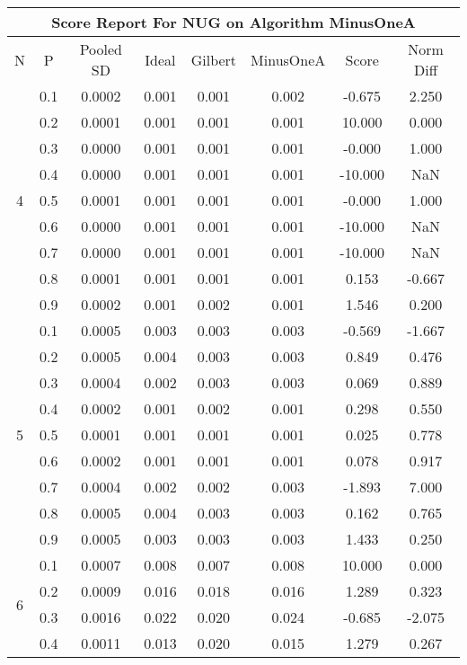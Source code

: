 \documentclass[11pt,a4paper]{report}
\begin{document}
\begin{longtable}{ | c | c || c | c | c | c | c | c | }
\hline
\multicolumn{8}{|c|}{ Score Report For NUG on Algorithm MinusOneA} \\
\hline
N & P & Pooled SD &  Ideal &  Gilbert & MinusOneA  & Score & Norm Diff \\
 \hline
 \hline
 \endhead
\multirow{9}{*}{4} & 0.1 & 0.0002 & 0.001 & 0.001 & 0.002 & -0.675 & 2.250 \\
 & 0.2 & 0.0001 & 0.001 & 0.001 & 0.001 & 10.000 & 0.000 \\
 & 0.3 & 0.0000 & 0.001 & 0.001 & 0.001 & -0.000 & 1.000 \\
 & 0.4 & 0.0000 & 0.001 & 0.001 & 0.001 & -10.000 & NaN \\
 & 0.5 & 0.0001 & 0.001 & 0.001 & 0.001 & -0.000 & 1.000 \\
 & 0.6 & 0.0000 & 0.001 & 0.001 & 0.001 & -10.000 & NaN \\
 & 0.7 & 0.0000 & 0.001 & 0.001 & 0.001 & -10.000 & NaN \\
 & 0.8 & 0.0001 & 0.001 & 0.001 & 0.001 & 0.153 & -0.667 \\
 & 0.9 & 0.0002 & 0.001 & 0.002 & 0.001 & 1.546 & 0.200 \\
 \hline
\multirow{9}{*}{5} & 0.1 & 0.0005 & 0.003 & 0.003 & 0.003 & -0.569 & -1.667 \\
 & 0.2 & 0.0005 & 0.004 & 0.003 & 0.003 & 0.849 & 0.476 \\
 & 0.3 & 0.0004 & 0.002 & 0.003 & 0.003 & 0.069 & 0.889 \\
 & 0.4 & 0.0002 & 0.001 & 0.002 & 0.001 & 0.298 & 0.550 \\
 & 0.5 & 0.0001 & 0.001 & 0.001 & 0.001 & 0.025 & 0.778 \\
 & 0.6 & 0.0002 & 0.001 & 0.001 & 0.001 & 0.078 & 0.917 \\
 & 0.7 & 0.0004 & 0.002 & 0.002 & 0.003 & -1.893 & 7.000 \\
 & 0.8 & 0.0005 & 0.004 & 0.003 & 0.003 & 0.162 & 0.765 \\
 & 0.9 & 0.0005 & 0.003 & 0.003 & 0.003 & 1.433 & 0.250 \\
 \hline
\multirow{9}{*}{6} & 0.1 & 0.0007 & 0.008 & 0.007 & 0.008 & 10.000 & 0.000 \\
 & 0.2 & 0.0009 & 0.016 & 0.018 & 0.016 & 1.289 & 0.323 \\
 & 0.3 & 0.0016 & 0.022 & 0.020 & 0.024 & -0.685 & -2.075 \\
 & 0.4 & 0.0011 & 0.013 & 0.020 & 0.015 & 1.279 & 0.267 \\

\end{longtable}
\end{document}
